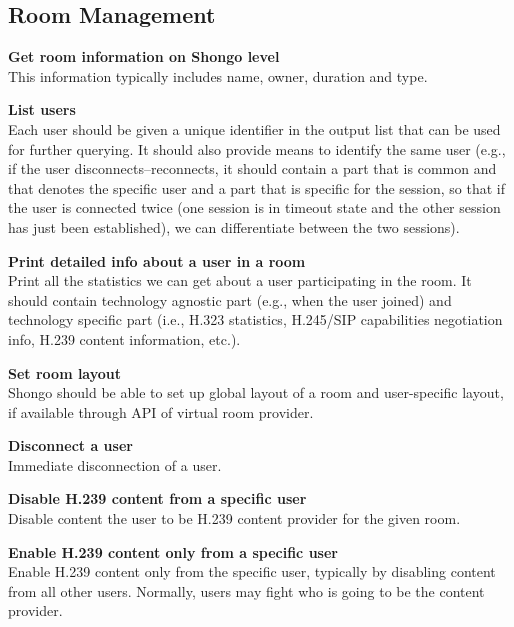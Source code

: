 \documentclass[a4paper]{report}
\makeatletter
\newcounter{UCcounter}
\newenvironment{UseCases}%
	{\begin{list}{\textbf{UC-\arabic{UCcounter}}}{\@nmbrlisttrue\def\@listctr{UCcounter}}}%
	{\end{list}}
\newcommand{\UClabel}[1]{\label{UC:#1}}
\newcommand{\UseCase}[2]{\item\UClabel{#2} \textbf{#1}\\}
\makeatother
\begin{document}
\subsection{Room Management}

\begin{UseCases}

\UseCase{Get room information on Shongo level}{ops:room:shongo-options}

This information typically includes name, owner, duration and type.


\UseCase{List users}{ops:room:users-list}

Each user should be given a unique identifier in the output list that can be
used for further querying. It should also provide means to identify the same
user (e.g., if the user disconnects--reconnects, it should contain a part that
is common and that denotes the specific user and a part that is specific for
the session, so that if the user is connected twice (one session is in timeout
state and the other session has just been established), we can differentiate
between the two sessions).

\UseCase{Print detailed info about a user in a room}{ops:room:user-info}

Print all the statistics we can get about a user participating in the room. It
should contain technology agnostic part (e.g., when the user joined) and
technology specific part (i.e., H.323 statistics, H.245/SIP capabilities
negotiation info, H.239 content information, etc.).

\UseCase{Set room layout}{ops:room:layout}

Shongo should be able to set up global layout of a room and user-specific
layout, if available through API of virtual room provider.

\UseCase{Disconnect a user}{ops:room:user-disconnect}

Immediate disconnection of a user.

\UseCase{Disable H.239 content from a specific user}{ops:room:disable-user-content}

Disable content the user to be H.239 content provider for the given room. 

\UseCase{Enable H.239 content only from a specific user}{ops:room:specific-user-content}

Enable H.239 content only from the specific user, typically by disabling
content from all other users. Normally, users may fight who is going to be the
content provider.


\end{UseCases}
\end{document}
